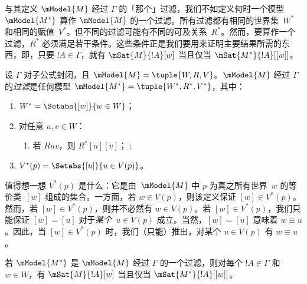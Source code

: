 \documentclass[../../../include/open-logic-section]{subfiles}
\begin{document}


与其定义 $\mModel{M}$ 经过 $\Gamma$ 的「那个」过滤，我们不如定义何时一个模型~$\mModel{M^*}$ 算作 $\mModel{M}$ 的一个过滤。所有过滤都有相同的世界集~$W^*$ 和相同的赋值~$V^*$。但不同的过滤可能有不同的可及关系~$R^*$。然而，要算作一个过滤，$R^*$ 必须满足若干条件。这些条件正是我们要用来证明主要结果所需的东西，即，只要 $!A \in \Gamma$，就有
$\mSat{M}{!A}[w]$ 当且仅当 $\mSat{M^*}{!A}[{[w]}]$。

\begin{defn}
  设 $\Gamma$ 对子公式封闭，且 $\mModel{M} = \tuple{W, R, V}$。$\mModel{M}$ 经过 $\Gamma$ 的\emph{过滤}是任何模型 $\mModel{M^*} = \tuple{W^*,R^*,V^*}$，其中：
  \begin{enumerate}
  \item $W^* = \Setabs{[w]}{w \in W}$；
  \item {}%
    对任意 $u,v \in W$：
    \begin{enumerate}
    \item {}%
      若 $Ruv$，则 $R^*[u][v]$；
    ;
    \end{enumerate}
  \item $V^*(p) = \Setabs{[u]}{u \in V(p)}$。
  \end{enumerate}
\end{defn}

值得想一想 $V^*(p)$ 是什么：它是由~$\mModel{M}$ 中 $p$ 为真之所有世界~$w$ 的等价类~$[w]$ 组成的集合。一方面，若 $w \in V(p)$，则该定义保证 $[w] \in V^*(p)$。然而，若 $[w] \in V^*(p)$，则并不必然有 $w \in V(p)$。若 $[w] \in V^*(p)$，我们只能保证 $[w] = [u]$ 对于\emph{某个}~$u \in V(p)$ 成立。当然，$[w] = [u]$ 意味着 $w \equiv u$。因此，当 $[w] \in V^*(p)$ 时，我们（只能）推出，对某个 $u \in V(p)$ 有 $w \equiv u$。

\begin{thm}
  若 $\mModel{M^*}$ 是 $\mModel{M}$ 经过 $\Gamma$ 的一个过滤，则对每个 $!A \in \Gamma$ 和 $w \in W$，有 $\mSat{M}{!A}[w]$ 当且仅当 $\mSat{M^*}{!A}[{[w]}]$。
\end{thm}
\end{document}
